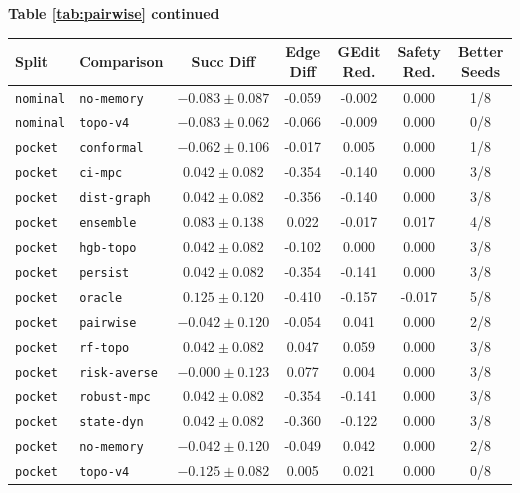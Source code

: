 \documentclass{article}
\begin{document}
\begin{center}
\textbf{Table \ref{tab:pairwise} continued}\\[0.4ex]
\begin{tabular}{llccccc}
\toprule
Split & Comparison & Succ Diff & Edge Diff & GEdit Red. & Safety Red. & Better Seeds \\
\midrule
\texttt{nominal} & \texttt{no-memory} & $-0.083 \pm 0.087$ & -0.059 & -0.002 & 0.000 & 1/8 \\
\texttt{nominal} & \texttt{topo-v4} & $-0.083 \pm 0.062$ & -0.066 & -0.009 & 0.000 & 0/8 \\
\texttt{pocket} & \texttt{conformal} & $-0.062 \pm 0.106$ & -0.017 & 0.005 & 0.000 & 1/8 \\
\texttt{pocket} & \texttt{ci-mpc} & $0.042 \pm 0.082$ & -0.354 & -0.140 & 0.000 & 3/8 \\
\texttt{pocket} & \texttt{dist-graph} & $0.042 \pm 0.082$ & -0.356 & -0.140 & 0.000 & 3/8 \\
\texttt{pocket} & \texttt{ensemble} & $0.083 \pm 0.138$ & 0.022 & -0.017 & 0.017 & 4/8 \\
\texttt{pocket} & \texttt{hgb-topo} & $0.042 \pm 0.082$ & -0.102 & 0.000 & 0.000 & 3/8 \\
\texttt{pocket} & \texttt{persist} & $0.042 \pm 0.082$ & -0.354 & -0.141 & 0.000 & 3/8 \\
\texttt{pocket} & \texttt{oracle} & $0.125 \pm 0.120$ & -0.410 & -0.157 & -0.017 & 5/8 \\
\texttt{pocket} & \texttt{pairwise} & $-0.042 \pm 0.120$ & -0.054 & 0.041 & 0.000 & 2/8 \\
\texttt{pocket} & \texttt{rf-topo} & $0.042 \pm 0.082$ & 0.047 & 0.059 & 0.000 & 3/8 \\
\texttt{pocket} & \texttt{risk-averse} & $-0.000 \pm 0.123$ & 0.077 & 0.004 & 0.000 & 3/8 \\
\texttt{pocket} & \texttt{robust-mpc} & $0.042 \pm 0.082$ & -0.354 & -0.141 & 0.000 & 3/8 \\
\texttt{pocket} & \texttt{state-dyn} & $0.042 \pm 0.082$ & -0.360 & -0.122 & 0.000 & 3/8 \\
\texttt{pocket} & \texttt{no-memory} & $-0.042 \pm 0.120$ & -0.049 & 0.042 & 0.000 & 2/8 \\
\texttt{pocket} & \texttt{topo-v4} & $-0.125 \pm 0.082$ & 0.005 & 0.021 & 0.000 & 0/8 \\
\bottomrule
\end{tabular}
\end{center}
\normalsize
\end{document}
